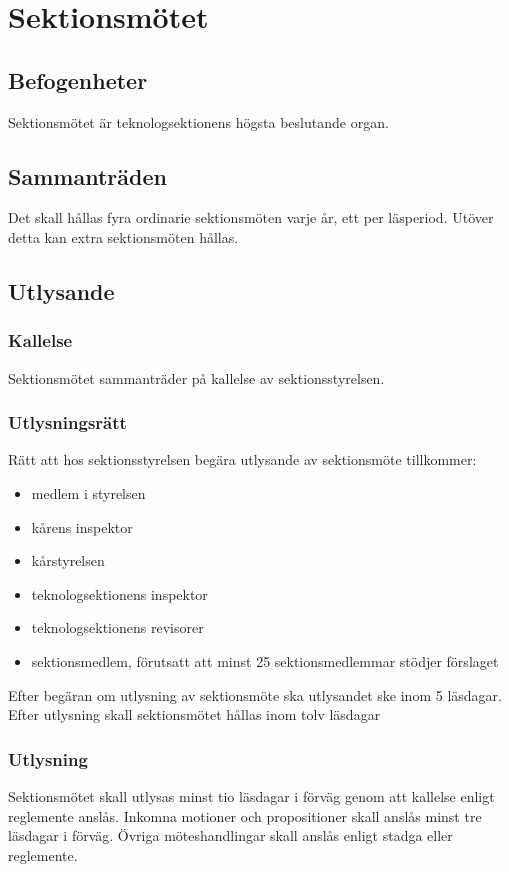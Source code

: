 \section{Sektionsmötet}

\subsection{Befogenheter}
Sektionsmötet är teknologsektionens högsta beslutande organ.

\subsection{Sammanträden}
Det skall hållas fyra ordinarie sektionsmöten varje år, ett per läsperiod. Utöver detta kan extra sektionsmöten hållas.

\subsection{Utlysande}
\label{sec:utlysande}

\subsubsection{Kallelse}
Sektionsmötet sammanträder på kallelse av sektionsstyrelsen.

\subsubsection{Utlysningsrätt}
Rätt att hos sektionsstyrelsen begära utlysande av sektionsmöte tillkommer:

\begin{itemize}
	\item medlem i styrelsen
	\item kårens inspektor
	\item kårstyrelsen
	\item teknologsektionens inspektor
	\item teknologsektionens revisorer
	\item sektionsmedlem, förutsatt att minst 25 sektionsmedlemmar stödjer förslaget
\end{itemize}

Efter begäran om utlysning av sektionsmöte ska utlysandet ske inom 5 läsdagar. Efter utlysning skall sektionsmötet hållas inom tolv läsdagar

\subsubsection{Utlysning}
Sektionsmötet skall utlysas minst tio läsdagar i förväg genom att kallelse enligt reglemente anslås. Inkomna motioner och propositioner skall anslås minst tre läsdagar i förväg. Övriga möteshandlingar skall anslås enligt stadga eller reglemente. 

